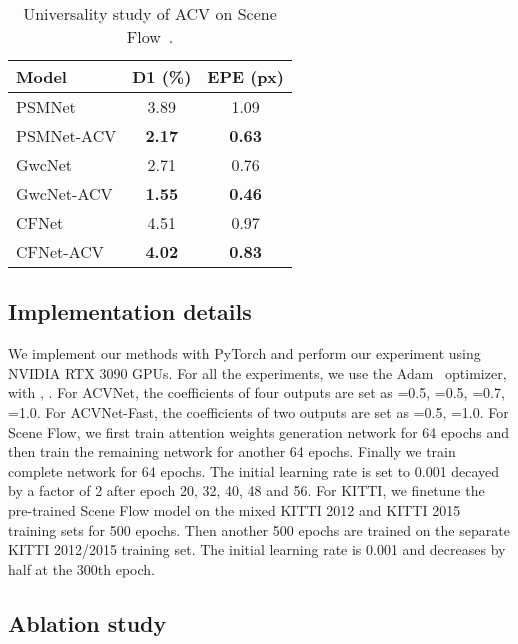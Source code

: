 \documentclass[10pt,twocolumn,letterpaper]{article}
\begin{document}
\begin{table} 
\begin{center}
\begin{tabular}{l|c|c}
\hline
Model  & D1 (\%) & EPE (px)\\ 
\hline
PSMNet~\cite{chang2018pyramid} & 3.89 & 1.09 \\
PSMNet-ACV & \textbf{2.17} & \textbf{0.63} \\
\hline
GwcNet~\cite{guo2019group} & 2.71 & 0.76 \\
GwcNet-ACV & \textbf{1.55} & \textbf{0.46} \\
\hline
CFNet~\cite{shen2021cfnet} & 4.51 & 0.97 \\
CFNet-ACV & \textbf{4.02} & \textbf{0.83} \\
\hline
\end{tabular}
\end{center}
\vspace{-10pt}
\caption{Universality study of ACV on Scene Flow~\cite{dispNetC2016large}.}\label{tab:universality}
\vspace{-10pt}
\end{table}

\subsection{Implementation details} \label{sec:Implementation details}
We implement our methods with PyTorch and perform our experiment using NVIDIA RTX 3090 GPUs. For all the experiments, we use the Adam~\cite{kingma2014adam} optimizer, with , . For ACVNet, the coefficients of four outputs are set as =0.5, =0.5, =0.7, =1.0. For ACVNet-Fast, the coefficients of two outputs are set as =0.5, =1.0. For Scene Flow, we first train attention weights generation network for 64 epochs and then train the remaining network for another 64 epochs. Finally we train complete network for 64 epochs. The initial learning rate is set to 0.001 decayed by a factor of 2 after epoch 20, 32, 40, 48 and 56. For KITTI, we finetune the pre-trained Scene Flow model on the mixed KITTI 2012 and KITTI 2015 training sets for 500 epochs. Then another 500 epochs are trained on the separate KITTI 2012/2015 training set. The initial learning rate is 0.001 and decreases by half at the 300th epoch.



\subsection{Ablation study} \label{sec:Ablation study}
\end{document}
